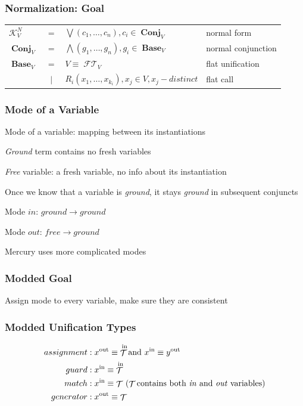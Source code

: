 \documentclass[xcolor=table]{beamer}
\DeclareMathOperator{\Term}{\mathcal{T}}
\DeclareMathOperator{\FlatTerm}{\mathcal{FT}}
\DeclareMathOperator{\Base}{\mathbf{Base}}
\DeclareMathOperator{\Conj}{\mathbf{Conj}}
\DeclareMathOperator{\inmode}{in}
\DeclareMathOperator{\outmode}{out}
\newcommand{\KanN}{\mathcal{K}^{N}}
\begin{document}
\begin{frame}[fragile]
  \frametitle{Normalization: Goal}
\begin{tabular}{lcll}
$\KanN_{V}$ & $=$ & $\bigvee\left( c_1, \ldots, c_{n} \right), c_{i}\in \Conj_{V}$ & normal form \\
$\Conj_{V}$ & $=$ & $\bigwedge\left( g_1, \ldots, g_n \right), g_{i}\in \Base_{V}$ & normal conjunction \\
$\Base_{V}$ & $=$ & $V \equiv \FlatTerm_{V}$ & flat unification \\
            & $\mid$ & $R_{i}\left( x_1, \ldots, x_{k_{i}} \right), x_{j}\in V, x_j - distinct$ & flat call \\
\end{tabular}
\end{frame}


\begin{frame}[fragile]
  \frametitle{Mode of a Variable}
Mode of a variable: mapping between its instantiations

\vfill

\emph{Ground} term contains no fresh variables

\emph{Free} variable: a fresh variable, no info about its instantiation

\vfill

Once we know that a variable is \emph{ground}, it stays \emph{ground} in subsequent conjuncts

\vfill

Mode $in$: $ground \rightarrow ground$

Mode $out$: $free \rightarrow ground$

\vfill

Mercury uses more complicated modes

\end{frame}

\begin{frame}[fragile]
  \frametitle{Modded Goal}
Assign mode to every variable, make sure they are consistent
\end{frame}

\begin{frame}[fragile]
  \frametitle{Modded Unification Types}
\begin{equation*}
\begin{split}
  assignment &: x^{\outmode}  \equiv \Term^{\inmode} \text{and } x^{\inmode} \equiv y^{\outmode} \\
  guard &: x^{\inmode} \equiv \Term^{\inmode} \\
  match &: x^{\inmode} \equiv \Term \ (\Term \text{contains both \emph{in} and \emph{out} variables}) \\
  generator &: x^{\outmode} \equiv \Term
\end{split}
\end{equation*}
\end{frame}
\end{document}
